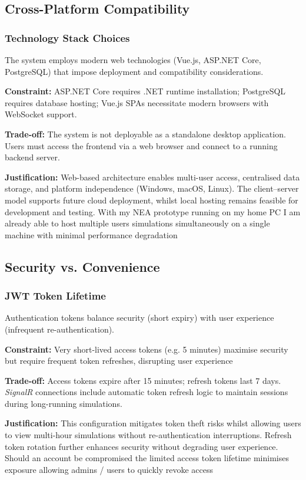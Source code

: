 \subsection{Cross-Platform Compatibility}

\subsubsection*{Technology Stack Choices}
The system employs modern web technologies (Vue.js, ASP.NET Core, PostgreSQL) that impose deployment and compatibility considerations.

\textbf{Constraint:} ASP.NET Core requires .NET runtime installation; PostgreSQL requires database hosting; Vue.js SPAs necessitate modern browsers with WebSocket support.

\textbf{Trade-off:} The system is not deployable as a standalone desktop application. Users must access the frontend via a web browser and connect to a running backend server.

\textbf{Justification:} Web-based architecture enables multi-user access, centralised data storage, and platform independence (Windows, macOS, Linux). The client–server model supports future cloud deployment, whilst local hosting remains feasible for development and testing. With my NEA prototype running on my home PC I am already able to host multiple users simulations simultaneously on a single machine with minimal performance degradation

\subsection{Security vs. Convenience}

\subsubsection*{JWT Token Lifetime}
Authentication tokens balance security (short expiry) with user experience (infrequent re-authentication).

\textbf{Constraint:} Very short-lived access tokens (e.g. 5 minutes) maximise security but require frequent token refreshes, disrupting user experience

\textbf{Trade-off:} Access tokens expire after 15 minutes; refresh tokens last 7 days. \textit{SignalR} connections include automatic token refresh logic to maintain sessions during long-running simulations.

\textbf{Justification:} This configuration mitigates token theft risks whilst allowing users to view multi-hour simulations without re-authentication interruptions. Refresh token rotation further enhances security without degrading user experience. Should an account be compromised the limited access token lifetime minimises exposure allowing admins / users to quickly revoke access

